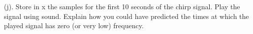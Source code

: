 (j). Store in x the samples for the first 10 seconds of the chirp signal. Play the signal using sound. Explain how you could have predicted the times at which the played signal has zero (or very low) frequency.
